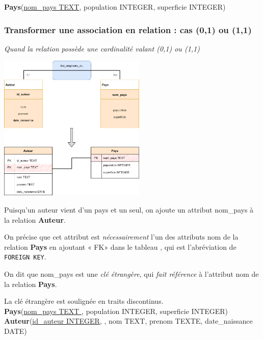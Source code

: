 \documentclass[10pt,cours,a4paper,firamath]{nsi}
\begin{document}
\textbf{Pays}(\uline{nom\_pays TEXT}, population INTEGER, superficie INTEGER)\\




\subsubsection{Transformer une association en relation : cas (0,1) ou (1,1)}
\textit{Quand la relation possède une cardinalité valant (0,1) ou (1,1)}
\begin{center}
	\includegraphics[width=7cm]{img/association_vers_relation_1}
\end{center}

Puisqu'un auteur vient d'un pays et un seul, on ajoute un attribut nom\_pays à la relation \textbf{Auteur}.

On précise que cet attribut est \textit{nécessairement} l'un des attributs nom de la relation \textbf{Pays} en ajoutant « FK»  dans le tableau , qui est l'abréviation de \texttt{FOREIGN KEY}.

On dit que nom\_pays est une \textit{clé étrangère}, qui \textit{fait référence} à l'attribut nom de la relation \textbf{Pays}.

La clé étrangère est soulignée en traits discontinus.\\



\textbf{Pays}(\uline{nom\_pays TEXT }, population INTEGER, superficie INTEGER)\\

\textbf{Auteur}(\uline{id\_auteur INTEGER},  , nom TEXT, prenom TEXTE, date\_naissance DATE)
\end{document}
